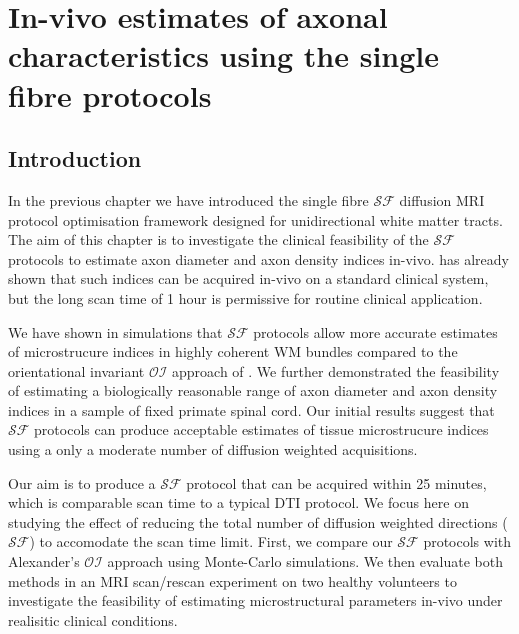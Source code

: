\newcommand{\SF}{{\ensuremath{\mathcal{SF}}}}
\newcommand{\OI}{{\ensuremath{\mathcal{OI}}}}
\newcommand{\SD}{{\ensuremath{\mathcal{SF}_{pulses}}}}
\newcommand{\DO}{{\ensuremath{\mathcal{SF}_{dirs}}}}
\newcommand{\FD}{{\SF}}
\newcommand{\FDmod}{{\ensuremath{\FD_{mod}}}}
\newcommand{\SFasym}{{\ensuremath{a\mathcal{SF}}}}

\newcommand{\SFshort}{\SF$_{90}$}
\newcommand{\SFlong}{\SF$_{360}$}
\newcommand{\OIlong}{\OI$_{360}$}




\chapter{In-vivo estimates of axonal characteristics using the single fibre protocols}
\label{chapter 8}
\section{Introduction}
In the previous chapter we have introduced the single fibre \SF{} diffusion MRI protocol optimisation framework designed for unidirectional white matter tracts. The aim of this chapter is to investigate the clinical feasibility of the \SF{} protocols to estimate axon diameter and axon density indices in-vivo.  has already shown that such indices can be acquired in-vivo on a standard clinical system, but the long scan time of 1 hour is permissive for routine clinical application.  


We have shown in simulations that \SF{} protocols allow more accurate estimates of microstrucure indices in highly coherent WM bundles compared to the orientational invariant \OI{} approach of \citep{Alexander:2008}. We further demonstrated the feasibility of estimating a biologically reasonable range of axon diameter and axon density indices in a sample of fixed primate spinal cord. Our initial results suggest that \SF{} protocols can produce acceptable estimates of tissue microstrucure indices using a only a moderate number of diffusion weighted acquisitions. 

Our aim is to produce a \SF{} protocol that can be acquired within 25 minutes, which is comparable scan time to a typical DTI protocol. We focus here on studying the effect of reducing the total number of diffusion weighted directions (\SF{}) to accomodate the scan time limit. First, we compare our \SF{} protocols with Alexander's \OI{} approach using Monte-Carlo simulations. We then evaluate both methods in an MRI scan/rescan experiment on two healthy volunteers to investigate the feasibility of estimating microstructural parameters in-vivo under realisitic clinical conditions.

